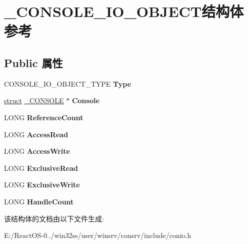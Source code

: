 \hypertarget{struct___c_o_n_s_o_l_e___i_o___o_b_j_e_c_t}{}\section{\+\_\+\+C\+O\+N\+S\+O\+L\+E\+\_\+\+I\+O\+\_\+\+O\+B\+J\+E\+C\+T结构体 参考}
\label{struct___c_o_n_s_o_l_e___i_o___o_b_j_e_c_t}
\subsection*{Public 属性}
\begin{DoxyCompactItemize}
\item 
\mbox{\label{struct___c_o_n_s_o_l_e___i_o___o_b_j_e_c_t_a62b808d4674bb5e485edafc81371fea8}} 
C\+O\+N\+S\+O\+L\+E\+\_\+\+I\+O\+\_\+\+O\+B\+J\+E\+C\+T\+\_\+\+T\+Y\+PE {\bfseries Type}
\item 
\mbox{\label{struct___c_o_n_s_o_l_e___i_o___o_b_j_e_c_t_ac5291b9dd8ac15d7d23285cdbec9c588}} 
\hyperlink{interfacestruct}{struct} \hyperlink{struct___c_o_n_s_o_l_e}{\+\_\+\+C\+O\+N\+S\+O\+LE} $\ast$ {\bfseries Console}
\item 
\mbox{\label{struct___c_o_n_s_o_l_e___i_o___o_b_j_e_c_t_af46f711c7be86c485281da68721f8c26}} 
L\+O\+NG {\bfseries Reference\+Count}
\item 
\mbox{\label{struct___c_o_n_s_o_l_e___i_o___o_b_j_e_c_t_adbd0d2f17e29c61bd496cc8255b8b996}} 
L\+O\+NG {\bfseries Access\+Read}
\item 
\mbox{\label{struct___c_o_n_s_o_l_e___i_o___o_b_j_e_c_t_a6f5d287c222faa880627e3d634775922}} 
L\+O\+NG {\bfseries Access\+Write}
\item 
\mbox{\label{struct___c_o_n_s_o_l_e___i_o___o_b_j_e_c_t_a339d09fe718b0613f91fb3d5be7e25a2}} 
L\+O\+NG {\bfseries Exclusive\+Read}
\item 
\mbox{\label{struct___c_o_n_s_o_l_e___i_o___o_b_j_e_c_t_a346a8f74d16e7914fd67d5c62a139f83}} 
L\+O\+NG {\bfseries Exclusive\+Write}
\item 
\mbox{\label{struct___c_o_n_s_o_l_e___i_o___o_b_j_e_c_t_ad59898acaa927c61ffde10e7c063e712}} 
L\+O\+NG {\bfseries Handle\+Count}
\end{DoxyCompactItemize}


该结构体的文档由以下文件生成\+:\begin{DoxyCompactItemize}
\item 
E\+:/\+React\+O\+S-\/0../win32ss/user/winsrv/consrv/include/conio.\+h\end{DoxyCompactItemize}
